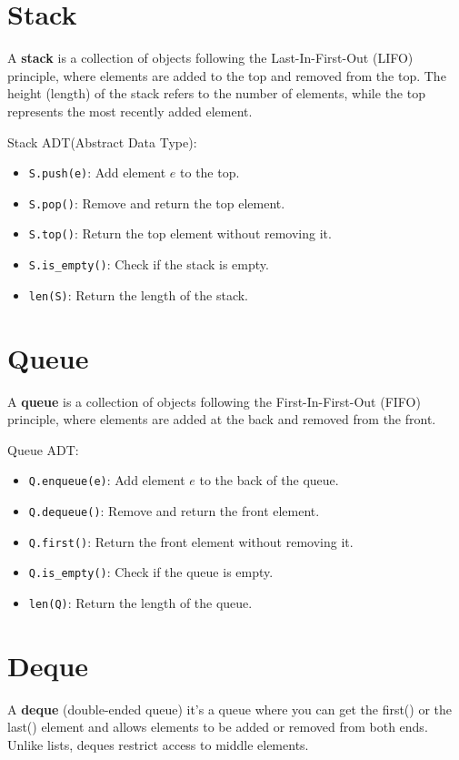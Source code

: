     \section{Stack}
    A \textbf{stack} is a collection of objects following the Last-In-First-Out (LIFO) principle, where elements are added to the top and removed from the top. The height (length) of the stack refers to the number of elements, while the top represents the most recently added element.
    
    Stack ADT(Abstract Data Type):
    \begin{itemize}
        \item \texttt{S.push(e)}: Add element \(e\) to the top.
        \item \texttt{S.pop()}: Remove and return the top element.
        \item \texttt{S.top()}: Return the top element without removing it.
        \item \texttt{S.is\_empty()}: Check if the stack is empty.
        \item \texttt{len(S)}: Return the length of the stack.
    \end{itemize}
    
    \section{Queue}
    A \textbf{queue} is a collection of objects following the First-In-First-Out (FIFO) principle, where elements are added at the back and removed from the front.
    
    Queue ADT:
    \begin{itemize}
        \item \texttt{Q.enqueue(e)}: Add element \(e\) to the back of the queue.
        \item \texttt{Q.dequeue()}: Remove and return the front element.
        \item \texttt{Q.first()}: Return the front element without removing it.
        \item \texttt{Q.is\_empty()}: Check if the queue is empty.
        \item \texttt{len(Q)}: Return the length of the queue.
    \end{itemize}
    
    \section{Deque}
    A \textbf{deque} (double-ended queue) it's a queue where you can get the first() or the last() element and allows elements to be added or removed from both ends. Unlike lists, deques restrict access to middle elements.
    
